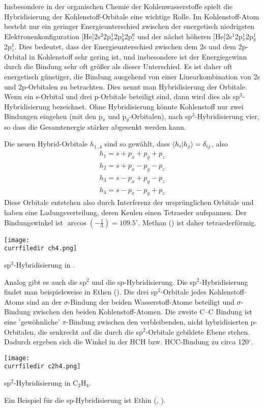 Insbesondere in der organischen Chemie der Kohlenwasserstoffe spielt die Hybridisierung der Kohlenstoff-Orbitale eine wichtige Rolle. Im Kohlenstoff-Atom besteht nur ein geringer Energieunterschied zwischen der energetisch niedrigsten Elektronenkonfiguration
[He]2s$^2$2p$_x^1$2p$_y^1$2p$_z^0$ und der nächst höheren [He]2s$^1$2p$_x^1$2p$_y^1$2p$_z^1$. Dies bedeutet, dass der Energieunterschied zwischen dem 2s und dem 2p-Orbital in Kohlenstoff sehr gering ist, und insbesondere 
ist der Energiegewinn durch die Bindung sehr oft größer als dieser Unterschied. Es ist daher oft energetisch günstiger, die Bindung ausgehend von einer Linearkombination von 2s und 2p-Orbitalen zu betrachten. Dies nennt man Hybridisierung der Orbitale. Wenn ein s-Orbital und drei p-Orbitale beteiligt sind, dann wird dies als sp$^3$-Hybridisierung bezeichnet. Ohne Hybridisierung könnte Kohlenstoff nur zwei Bindungen eingehen (mit den p$_x$ und p$_y$-Orbitalen), nach sp$^3$-Hybridisierung vier, so dass die Gesamtenergie stärker abgesenkt werden kann.

Die neuen Hybrid-Orbitale $h_{1 .. 4}$ sind so gewählt, dass $\braket{h_i | h_j} = \delta_{ij}$, also
\begin{eqnarray}
 h_1 = s + p_x + p_y + p_z \\
 h_2 = s + p_x - p_y - p_z \\
 h_3 = s - p_x + p_y - p_z \\
 h_4 = s - p_x - p_y + p_z 
\end{eqnarray}
Diese Orbitale entstehen also durch Interferenz der ursprünglichen Orbitale und haben eine Ladungsverteilung, deren Keulen einen Tetraeder aufspannen. Der Bindungswinkel ist $\arccos (-\frac{1}{3}) = 109.5^\circ$. Methan () ist daher tetraederförmig.
%
\begin{marginfigure}
\texttt{[image: \\currfiledir ch4.png]}
\caption{sp$^3$-Hybridisierung in . }
\end{marginfigure}
%


Analog gibt es auch die sp$^2$ und die sp-Hybridisierung.  Die sp$^2$-Hybridisierung findet man beispielsweise in Ethen (). Die drei  sp$^2$-Orbitale jedes Kohlenstoff-Atoms sind an der $\sigma$-Bindung der beiden Wasserstoff-Atome beteiligt und $\sigma$-Bindung zwischen den beiden Kohlenstoff-Atomen. Die zweite C--C Bindung ist eine 'gewöhnliche' $\pi$-Bindung zwischen den verbleibenden, nicht hybridisierten p-Orbitalen, die senkrecht auf die durch die sp$^2$-Orbitale gebildete Ebene stehen. Dadurch ergeben sich die Winkel in der HCH bzw. HCC-Bindung zu circa 120$^\circ$.
%
\begin{marginfigure}
\texttt{[image: \\currfiledir c2h4.png]}
\caption{sp$^2$-Hybridisierung in C$_2$H$_4$. }
\end{marginfigure}
%

Ein Beispiel für die sp-Hybridisierung ist Ethin (,  ).

\printbibliography[segment=\therefsegment,heading=subbibliography]
